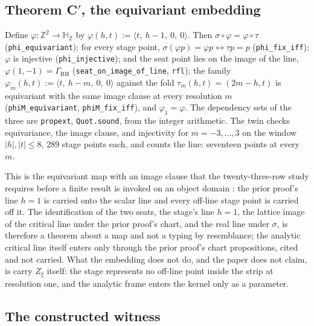 \documentclass[10pt,twocolumn]{article}
\begin{document}
\hypertarget{theorem-c-the-equivariant-embedding}{%
\subsection{\texorpdfstring{Theorem C\('\), the equivariant
embedding}{Theorem C\textquotesingle, the equivariant embedding}}\label{theorem-c-the-equivariant-embedding}}

Define \(\varphi : \mathbb{Z}^2 \to \mathbb{H}_{\mathbb{Z}}\) by
\(\varphi(h, t) := \langle t,\ h - 1,\ 0,\ 0 \rangle\). Then
\(\sigma \circ \varphi = \varphi \circ \tau\)
(\texttt{phi\_\allowbreak equivariant}); for every stage point,
\(\sigma(\varphi p) = \varphi p \leftrightarrow \tau p = p\)
(\texttt{phi\_\allowbreak fix\_\allowbreak iff}); \(\varphi\) is
injective (\texttt{phi\_\allowbreak injective}); and the seat point lies
on the image of the line, \(\varphi(1, -1) = \Gamma_{\mathrm{RH}}\)
(\texttt{seat\_\allowbreak on\_\allowbreak image\_\allowbreak of\_\allowbreak line},
\texttt{rfl}); the family
\(\varphi_m(h, t) := \langle t,\ h - m,\ 0,\ 0 \rangle\) against the
fold \(\tau_m(h, t) = (2m - h, t)\) is equivariant with the same image
clause at every resolution \(m\)
(\texttt{phiM\_\allowbreak equivariant},
\texttt{phiM\_\allowbreak fix\_\allowbreak iff}), and
\(\varphi_1 = \varphi\). The dependency sets of the three are
\texttt{propext}, \texttt{Quot.sound}, from the integer arithmetic. The
twin checks equivariance, the image clause, and injectivity for
\(m = -3, \dots, 3\) on the window \(|h|, |t| \le 8\), \(289\) stage
points each, and counts the line: seventeen points at every \(m\).

This is the equivariant map with an image clause that the
twenty-three-row study requires before a finite result is invoked on an
object domain \cite{islamrows}: the prior proof's line \(h = 1\) is
carried onto the scalar line and every off-line stage point is carried
off it. The identification of the two seats, the stage's line \(h = 1\),
the lattice image of the critical line under the prior proof's chart,
and the real line under \(\sigma\), is therefore a theorem about a map
and not a typing by resemblance; the analytic critical line itself
enters only through the prior proof's chart propositions, cited and not
carried. What the embedding does not do, and the paper does not claim,
is carry \(Z_\xi\) itself: the stage represents no off-line point inside
the strip at resolution one, and the analytic frame enters the kernel
only as a parameter.

\hypertarget{the-constructed-witness}{%
\subsection{The constructed witness}\label{the-constructed-witness}}
\end{document}
